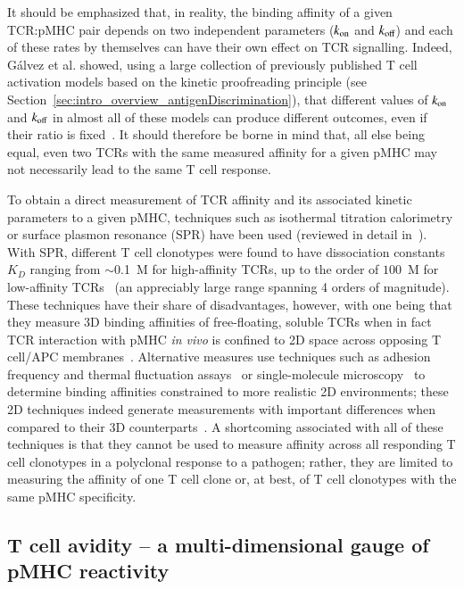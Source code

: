 It should be emphasized that, in reality, the binding affinity of a given TCR:pMHC pair depends on two independent parameters ($k_{\textup{on}}$ and $k_{\textup{off}}$) and each of these rates by themselves can have their own effect on TCR signalling. Indeed, Gálvez et al. showed, using a large collection of previously published T cell activation models based on the kinetic proofreading principle (see Section~\ref{sec:intro_overview_antigenDiscrimination}), that different values of $k_{\textup{on}}$ and $k_{\textup{off}}$ in almost all of these models can produce different outcomes, even if their ratio is fixed~\cite{galvez2019tcr}. It should therefore be borne in mind that, all else being equal, even two TCRs with the same measured affinity for a given pMHC may not necessarily lead to the same T cell response.

To obtain a direct measurement of TCR affinity and its associated kinetic parameters to a given pMHC, techniques such as isothermal titration calorimetry or surface plasmon resonance (SPR) have been used (reviewed in detail in~\cite{piepenbrink2009methods}). With SPR, different T cell clonotypes were found to have dissociation constants $K_D$ ranging from $\sim$0.1~\textmu{}M for high-affinity TCRs, up to the order of $100$~\textmu{}M for low-affinity TCRs~\cite{davis1998ligand,thomas2011human} (an appreciably large range spanning 4 orders of magnitude). These techniques have their share of disadvantages, however, with one being that they measure 3D binding affinities of free-floating, soluble TCRs when in fact TCR interaction with pMHC \textit{in vivo} is confined to 2D space across opposing T cell/APC membranes~\cite{martinez2015lower}. Alternative measures use techniques such as adhesion frequency and thermal fluctuation assays~\cite{huang2010kinetics} or single-molecule microscopy~\cite{huppa2010tcr} to determine binding affinities constrained to more realistic 2D environments; these 2D techniques indeed generate measurements with important differences when compared to their 3D counterparts~\cite{huang2010kinetics,huppa2010tcr,martinez2015lower}. A shortcoming associated with all of these techniques is that they cannot be used to measure affinity across all responding T cell clonotypes in a polyclonal response to a pathogen; rather, they are limited to measuring the affinity of one T cell clone or, at best, of T cell clonotypes with the same pMHC specificity.

\subsection{T cell avidity -- a multi-dimensional gauge of pMHC reactivity}
\label{sec:intro_affinity_TcellAvidity}

